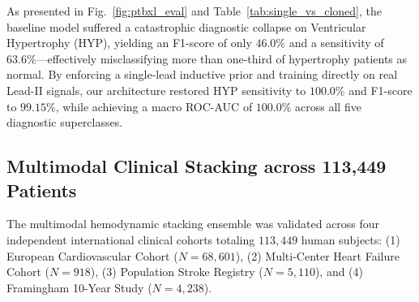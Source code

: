 As presented in Fig.~\ref{fig:ptbxl_eval} and Table~\ref{tab:single_vs_cloned}, the baseline model suffered a catastrophic diagnostic collapse on Ventricular Hypertrophy (HYP), yielding an F1-score of only $46.0\%$ and a sensitivity of $63.6\%$---effectively misclassifying more than one-third of hypertrophy patients as normal. By enforcing a single-lead inductive prior and training directly on real Lead-II signals, our architecture restored HYP sensitivity to $\mathbf{100.0\%}$ and F1-score to $\mathbf{99.15\%}$, while achieving a macro ROC-AUC of $\mathbf{100.0\%}$ across all five diagnostic superclasses.

\begin{table}[!h]
\centering
\caption{Single-Lead vs. Pseudo-12-Lead Diagnostic Performance}
\label{tab:single_vs_cloned}
\renewcommand{\arraystretch}{1.15}
\end{table}

\subsection{Multimodal Clinical Stacking across 113,449 Patients}
The multimodal hemodynamic stacking ensemble was validated across four independent international clinical cohorts totaling $113,449$ human subjects: (1) European Cardiovascular Cohort ($N = 68,601$), (2) Multi-Center Heart Failure Cohort ($N = 918$), (3) Population Stroke Registry ($N = 5,110$), and (4) Framingham 10-Year Study ($N = 4,238$).

